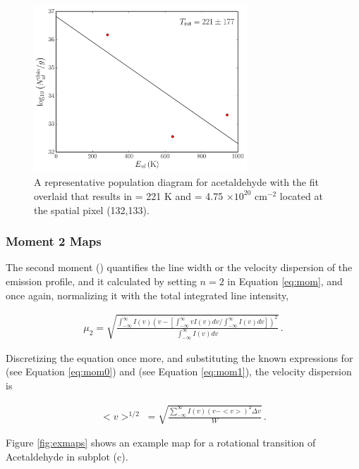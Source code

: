 \documentclass[iop,twocolappendix]{emulateapj}
\begin{document}
\begin{figure}[t]
\begin{center}
\includegraphics[width=8cm]{PopDiagram.pdf}
\caption{A representative population diagram for acetaldehyde with the fit overlaid that results in {\Trot} = 221 K and {\Ntot} = 4.75 ${\times}10^{20}$ cm$^{-2}$ located at the spatial pixel (132,133). }
\label{fig:PopDiagram}
\end{center}
\end{figure}

\subsubsection{Moment 2 Maps}
\label{subsubsec:mom2}

The second moment (\momtwo) quantifies the line width or the velocity dispersion of the emission profile, and it calculated by setting $n=2$ in Equation \ref{eq:mom}, and once again, normalizing it with the total integrated line intensity,

\begin{align} \label{eq:mom2}
{\mu}_2 = \sqrt{\frac{\int_{-\infty}^{\infty}I(v)(v-\left[ \int_{-\infty}^{\infty} v I(v)dv \Big/ \int_{-\infty}^{\infty} I(v)dv \right])^2}{\int_{-\infty}^{\infty}I(v)dv}}\,.
\end{align}

{\noindent}Discretizing the equation once more, and substituting the known expressions for {\momzero} (see Equation \ref{eq:mom0}) and {\momone} (see Equation \ref{eq:mom1}), the velocity dispersion is 

\begin{align} \label{eq:dispersion}
<v>^{1/2}{\;}= \sqrt{\frac{\sum_{-\infty}^{\infty}I(v)(v-<v>)^2{\Delta}v}{W}}\,.
\end{align}

{\noindent}Figure \ref{fig:exmaps} shows an example {\momtwo} map for a rotational transition of Acetaldehyde in subplot (c). 
\end{document}

